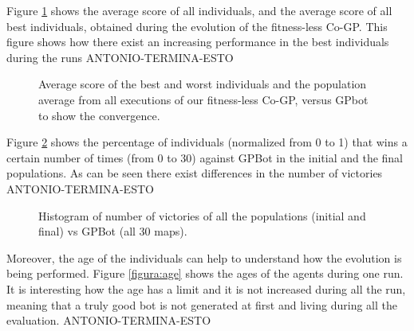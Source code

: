 \documentclass[conference]{IEEEtran}
\begin{document}
Figure \ref{figura:convergence} shows the average score of all individuals, and the average score of all best individuals, obtained during the evolution of the fitness-less Co-GP.
This figure shows how there exist an increasing performance in the best individuals during the runs ANTONIO-TERMINA-ESTO

\begin{figure}[htb]
\tiny
\begin{center}
\end{center}
\caption{Average score of the best and worst individuals and the
  population average from all executions of our fitness-less Co-GP,
  versus GPbot to show the convergence.} %
\label{figura:convergence}
\end{figure}





Figure \ref{figura:Victories_VS_GPBot_AllMaps} shows the percentage of individuals (normalized  from 0 to 1) that wins a certain number of times (from 0 to 30) against GPBot in the initial and the final populations. As can be seen there exist differences in the number of victories ANTONIO-TERMINA-ESTO

\begin{figure}[htb]
\tiny
\begin{center}
\end{center}
\caption{Histogram of number of victories of all the populations (initial and final) vs GPBot (all 30 maps).}
\label{figura:Victories_VS_GPBot_AllMaps}
\end{figure}


Moreover, the age of the individuals can help to understand how the evolution is being
performed. Figure \ref{figura:age} shows the ages of the agents during
one run. It is interesting how the age has a limit and it is not increased during all the run, meaning that a truly good bot is not
generated at first and living during all the evaluation. ANTONIO-TERMINA-ESTO
\end{document}
